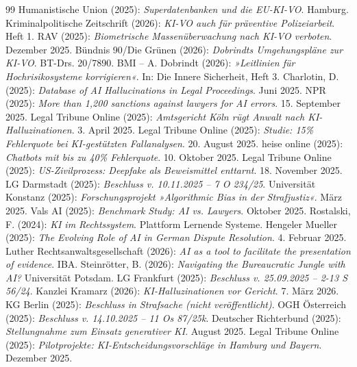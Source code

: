 \documentclass[12pt,a4paper]{article}
\begin{document}
\begin{thebibliography}{99}
		 Humanistische Union (2025): \emph{Superdatenbanken und die EU-KI-VO}. Hamburg.
		 Kriminalpolitische Zeitschrift (2026): \emph{KI-VO auch für präventive Polizeiarbeit}. Heft 1.
		 RAV (2025): \emph{Biometrische Massenüberwachung nach KI-VO verboten}. Dezember 2025.
		 Bündnis 90/Die Grünen (2026): \emph{Dobrindts Umgehungspläne zur KI-VO}. BT-Drs. 20/7890.
		 BMI – A. Dobrindt (2026): \emph{»Leitlinien für Hochrisikosysteme korrigieren«}. In: Die Innere Sicherheit, Heft 3.
		 Charlotin, D. (2025): \emph{Database of AI Hallucinations in Legal Proceedings}. Juni 2025.
		 NPR (2025): \emph{More than 1,200 sanctions against lawyers for AI errors}. 15. September 2025.
		 Legal Tribune Online (2025): \emph{Amtsgericht Köln rügt Anwalt nach KI-Halluzinationen}. 3. April 2025.
		 Legal Tribune Online (2025): \emph{Studie: 15\% Fehlerquote bei KI-gestützten Fallanalysen}. 20. August 2025.
		 heise online (2025): \emph{Chatbots mit bis zu 40\% Fehlerquote}. 10. Oktober 2025.
		 Legal Tribune Online (2025): \emph{US-Zivilprozess: Deepfake als Beweismittel enttarnt}. 18. November 2025.
		 LG Darmstadt (2025): \emph{Beschluss v. 10.11.2025 – 7 O 234/25}.
		 Universität Konstanz (2025): \emph{Forschungsprojekt »Algorithmic Bias in der Strafjustiz«}. März 2025.
		 Vals AI (2025): \emph{Benchmark Study: AI vs. Lawyers}. Oktober 2025.
		 Rostalski, F. (2024): \emph{KI im Rechtssystem}. Plattform Lernende Systeme.
		 Hengeler Mueller (2025): \emph{The Evolving Role of AI in German Dispute Resolution}. 4. Februar 2025.
		 Luther Rechtsanwaltsgesellschaft (2026): \emph{AI as a tool to facilitate the presentation of evidence}. IBA.
		 Steinrötter, B. (2026): \emph{Navigating the Bureaucratic Jungle with AI?} Universität Potsdam.
		 LG Frankfurt (2025): \emph{Beschluss v. 25.09.2025 – 2-13 S 56/24}.
		 Kanzlei Kramarz (2026): \emph{KI-Halluzinationen vor Gericht}. 7. März 2026.
		 KG Berlin (2025): \emph{Beschluss in Strafsache (nicht veröffentlicht)}.
		 OGH Österreich (2025): \emph{Beschluss v. 14.10.2025 – 11 Os 87/25k}.
		 Deutscher Richterbund (2025): \emph{Stellungnahme zum Einsatz generativer KI}. August 2025.
		 Legal Tribune Online (2025): \emph{Pilotprojekte: KI-Entscheidungsvorschläge in Hamburg und Bayern}. Dezember 2025.
		

\end{thebibliography}
\end{document}
